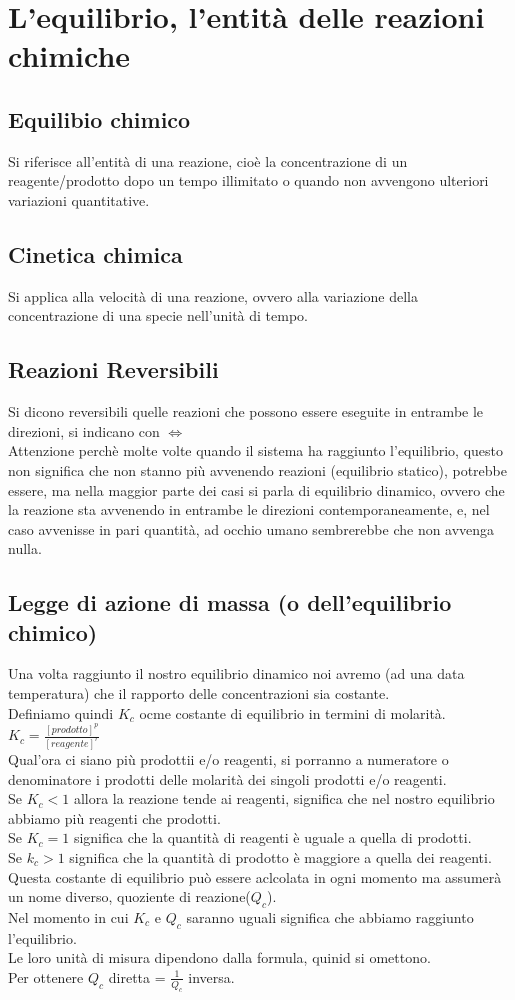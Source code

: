 \section{L'equilibrio, l'entità delle reazioni chimiche}
\subsection{Equilibio chimico}
Si riferisce all'entità di una reazione, cioè la concentrazione di un reagente/prodotto dopo un tempo illimitato o quando non avvengono ulteriori variazioni quantitative.
\subsection{Cinetica chimica}
Si applica alla velocità di una reazione, ovvero alla variazione della concentrazione di una specie nell'unità di tempo.
\subsection{Reazioni Reversibili}
Si dicono reversibili quelle reazioni che possono essere eseguite in entrambe le direzioni, si indicano con $\Leftrightarrow $\\
Attenzione perchè molte volte quando il sistema ha raggiunto l'equilibrio, questo non significa che non stanno più avvenendo reazioni (equilibrio statico), potrebbe essere, ma nella maggior parte dei casi si parla di equilibrio dinamico, ovvero che la reazione sta avvenendo in entrambe le direzioni contemporaneamente, e, nel caso avvenisse in pari quantità, ad occhio umano sembrerebbe che non avvenga nulla.
\subsection{Legge di azione di massa (o dell'equilibrio chimico)}
Una volta raggiunto il nostro equilibrio dinamico noi avremo (ad una data temperatura) che il rapporto delle concentrazioni sia costante.\\
Definiamo quindi $K_c$ ocme costante di equilibrio in termini di molarità.\\
$K_c = \frac{\left[prodotto\right]^p}{\left[reagente\right]^r}$\\
Qual'ora ci siano più prodottii e/o reagenti, si porranno a numeratore o denominatore i prodotti delle molarità dei singoli prodotti e/o reagenti.\\
Se $K_c < 1$ allora la reazione tende ai reagenti, significa che nel nostro equilibrio abbiamo più reagenti che prodotti.\\
Se $K_c = 1$ significa che la quantità di reagenti è uguale a quella di prodotti.\\
Se $k_c > 1$ significa che la quantità di prodotto è maggiore a quella dei reagenti.\\
Questa costante di equilibrio può essere aclcolata in ogni momento ma assumerà un nome diverso, quoziente di reazione($Q_c$).\\
Nel momento in cui $K_c$ e $Q_c$ saranno uguali significa che abbiamo raggiunto l'equilibrio.\\
Le loro unità di misura dipendono dalla formula, quinid si omettono.\\
Per ottenere $Q_c$ diretta = $\frac{1}{Q_c}$ inversa.
